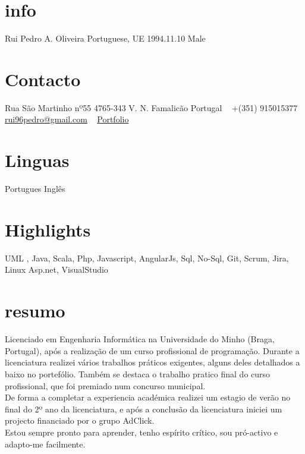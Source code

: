 \documentclass[]{friggeri-cv} %
\begin{document}


\begin{aside} %
\section{info}
Rui Pedro A. Oliveira
Portuguese, UE
1994.11.10
Male
\section{Contacto}
Rua São Martinho nº55
4765-343 V. N. Famalicão
Portugal
~
+(351) 915015377
~
\href{mailto:rui96pedro@gmail.com}{rui96pedro@gmail.com}
~
\href{https://bitbucket.com/ruioliveiras}{Portfolio}
~
\section{Linguas}
Portugues
Inglês 
\section{Highlights}
UML , 
Java, Scala, Php, 
Javascript, AngularJs,
Sql, No-Sql,
Git, Scrum, Jira, 
Linux %
Asp.net, VisualStudio
~
\end{aside}

\section{resumo}
Licenciado em Engenharia Informática na Universidade do Minho (Braga, Portugal), após a realização de um curso profissional de programação. Durante a licenciatura realizei vários trabalhos práticos exigentes, alguns deles detalhados a baixo no portefólio. Também se destaca o trabalho pratico final do curso profissional, que foi premiado num concurso municipal.\\ 
De forma a completar a experiencia académica realizei um estagio de verão no final do 2º ano da licenciatura, e após a conclusão da licenciatura iniciei um projecto financiado por o grupo AdClick.\\ 
Estou sempre pronto para aprender, tenho espírito crítico, sou pró-activo e adapto-me facilmente.
\end{document}
